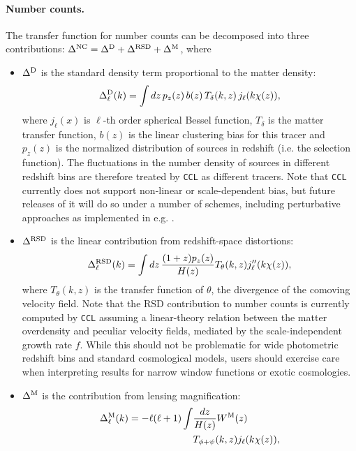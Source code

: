 \documentclass[\docopts]{\docclass}
\newcommand{\ccl}{{\tt CCL}\xspace}
\begin{document}
\paragraph{\bf Number counts.} The transfer function for number counts can be decomposed into three contributions: $\Delta^{\rm NC}=\Delta^{\rm D}+\Delta^{\rm RSD}+\Delta^{\rm M}$, where
\begin{itemize}
  \item $\Delta^{\rm D}$ is the standard density term proportional to the matter density:
        \begin{equation}
          \Delta^{\rm D}_\ell(k)=\int dz\,p_z(z)\,b(z)\,T_\delta(k,z)\,j_\ell(k\chi(z)),
        \end{equation}
        where $j_\ell(x)$ is $\ell$-th order spherical Bessel function, $T_\delta$ is the matter transfer function, $b(z)$ is the linear clustering bias for this tracer and $p_z(z)$ is the normalized distribution of sources in redshift (i.e. the selection function). The fluctuations in the number density of sources in different redshift bins are therefore treated by \ccl as different tracers. Note that \ccl currently does not support non-linear or scale-dependent bias, but future releases of it will do so under a number of schemes, including perturbative approaches as implemented in e.g. \cite{FASTPT}.
  \item $\Delta^{\rm RSD}$ is the linear contribution from redshift-space distortions:
        \begin{equation}
          \Delta^{\rm RSD}_\ell(k)=\int dz\,\frac{(1+z) p_z(z)}{H(z)}T_\theta(k,z) j_\ell''(k\chi(z)),
        \end{equation}
        where $T_\theta(k,z)$ is the transfer function of $\theta$, the divergence of the comoving velocity field. Note that the RSD contribution to number counts is currently computed by \ccl assuming a linear-theory relation between the matter overdensity and peculiar velocity fields, mediated by the scale-independent growth rate $f$. While this should not be problematic for wide photometric redshift bins and standard cosmological models, users should exercise care when interpreting results for narrow window functions or exotic cosmologies.
  \item $\Delta^{\rm M}$ is the contribution from lensing magnification:
        \begin{align}\nonumber
          \Delta_\ell^{\rm M}(k)=-\ell(\ell+1)\int & \frac{dz}{H(z)} W^{\rm M}(z) \\\label{eq:deltaM}
          &T_{\phi+\psi}(k,z) j_\ell(k\chi(z)),

\end{align}
\end{itemize}
\end{document}
